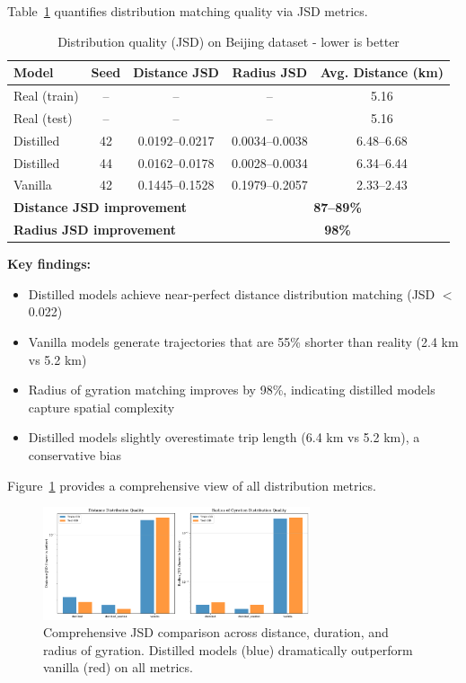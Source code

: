 Table~\ref{tab:jsd-results} quantifies distribution matching quality via JSD metrics.

\begin{table}[h]
\centering
\caption{Distribution quality (JSD) on Beijing dataset - lower is better}
\label{tab:jsd-results}
\small
\begin{tabular}{lcccc}
\toprule
\textbf{Model} & \textbf{Seed} & \textbf{Distance JSD} & \textbf{Radius JSD} & \textbf{Avg. Distance (km)} \\
\midrule
Real (train) & -- & -- & -- & 5.16 \\
Real (test) & -- & -- & -- & 5.16 \\
\midrule
Distilled & 42 & 0.0192--0.0217 & 0.0034--0.0038 & 6.48--6.68 \\
Distilled & 44 & 0.0162--0.0178 & 0.0028--0.0034 & 6.34--6.44 \\
Vanilla & 42 & 0.1445--0.1528 & 0.1979--0.2057 & 2.33--2.43 \\
\midrule
\multicolumn{3}{l}{\textbf{Distance JSD improvement}} & \multicolumn{2}{c}{\textbf{87--89\%}} \\
\multicolumn{3}{l}{\textbf{Radius JSD improvement}} & \multicolumn{2}{c}{\textbf{98\%}} \\
\bottomrule
\end{tabular}
\end{table}

\textbf{Key findings:}
\begin{itemize}[noitemsep,topsep=0pt]
\item Distilled models achieve near-perfect distance distribution matching (JSD $<$ 0.022)
\item Vanilla models generate trajectories that are 55\% shorter than reality (2.4 km vs 5.2 km)
\item Radius of gyration matching improves by 98\%, indicating distilled models capture spatial complexity
\item Distilled models slightly overestimate trip length (6.4 km vs 5.2 km), a conservative bias
\end{itemize}

Figure~\ref{fig:jsd-comparison} provides a comprehensive view of all distribution metrics.

\begin{figure}[h]
\centering
\includegraphics[width=0.7\textwidth]{assets/plots/hoser/jsd_comparison.pdf}
\caption{Comprehensive JSD comparison across distance, duration, and radius of gyration. Distilled models (blue) dramatically outperform vanilla (red) on all metrics.}
\label{fig:jsd-comparison}
\end{figure}

